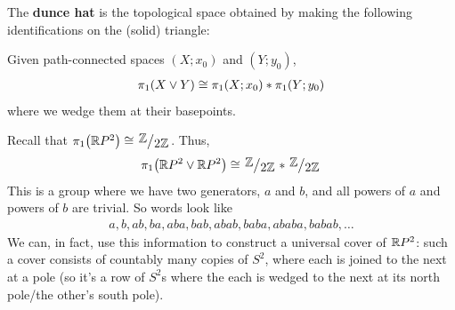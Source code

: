 \begin{boxexample}
    The \textbf{dunce hat} is the topological space obtained by making the following identifications on the (solid) triangle:
    \begin{figure}[H]
        \centering
    \end{figure}
    \sorry %
\end{boxexample}

\begin{boxcorollary}
    Given path-connected spaces $(X; x_0)$ and $(Y; y_0)$,
    \begin{align*}
        \pi_1\!\left( X \vee Y \right) \cong \pi_1\!\left( X; x_0 \right) * \pi_1\!\left( Y; y_0 \right)
    \end{align*}
    where we wedge them at their basepoints.
\end{boxcorollary}

\begin{boxexample}
    Recall that $\pi_1\of{\R P^2} \cong \Zmod{2}$. Thus,
    \begin{align*}
        \pi_1\of{\R P^2 \vee \R P^2} \cong \Zmod{2} * \Zmod{2}
    \end{align*}
    This is a group where we have two generators, $a$ and $b$, and all powers of $a$ and powers of $b$ are trivial. So words look like
    \begin{align*}
        a, b, ab, ba, aba, bab, abab, baba, ababa, babab, \ldots
    \end{align*}
    We can, in fact, use this information to construct a universal cover of $\mathbb{R} P^2$: such a cover consists of countably many copies of $S^2$, where each is joined to the next at a pole (so it's a row of $S^2$s where the each is wedged to the next at its north pole/the other's south pole).
\end{boxexample}
